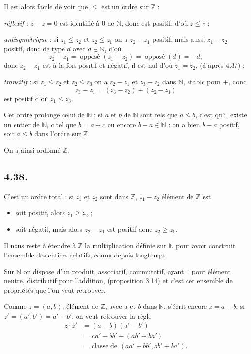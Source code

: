 Il est alors facile de voir que $\le$ est un ordre sur $\mathbb Z$ :

\emph{réflexif} : $z-z=0$ est identifié à $0$ de $\mathbb N$, donc est positif, d'où $z\le z$ ;

\emph{antisymétrique} : si $z_1\le z_2$ et $z_2\le z_1$ on a $z_2-z_1$ positif, mais aussi $z_1-z_2$ positif, donc de type $d$ avec $d\in\mathbb N$, d'où
\[
z_2-z_1=\operatorname{opposé}(z_1-z_2)=\operatorname{opposé}(d)=-d,
\]
donc $z_2-z_1$ est à la fois positif et négatif, il est nul d'où $z_1=z_2$, (d'après 4.37) ;

\emph{transitif} : si $z_1\le z_2$ et $z_2\le z_3$ on a $z_2-z_1$ et $z_3-z_2$ dans $\mathbb N$, stable pour $+$, donc
\[
z_3-z_1=(z_3-z_2)+(z_2-z_1)
\]
est positif d'où $z_1\le z_3$.

Cet ordre prolonge celui de $\mathbb N$ : si $a$ et $b$ de $\mathbb N$ sont tels que $a\le b$, c'est qu'il existe un entier de $\mathbb N$, $c$ tel que $b=a+c$ ou encore $b-a\in\mathbb N$ : on a bien $b-a$ positif, soit $a\le b$ dans l'ordre sur $\mathbb Z$.

On a ainsi ordonné $\mathbb Z$. \bookend

\subsection*{4.38.}
C'est un ordre total : si $z_1$ et $z_2$ sont dans $\mathbb Z$, $z_1-z_2$ élément de $\mathbb Z$ est
\begin{itemize}[leftmargin=2.2em]
\item soit positif, alors $z_1\ge z_2$ ;
\item soit négatif, mais alors $z_2-z_1$ est positif donc $z_2\ge z_1$.
\end{itemize}

Il nous reste à étendre à $\mathbb Z$ la multiplication définie sur $\mathbb N$ pour avoir construit l'ensemble des entiers relatifs, connu depuis longtemps.

Sur $\mathbb N$ on dispose d'un produit, associatif, commutatif, ayant $1$ pour élément neutre, distributif pour l'addition, (proposition 3.14) et c'est cet ensemble de propriétés que l'on veut retrouver.

Comme $z=\overline{(a,b)}$, élément de $\mathbb Z$, avec $a$ et $b$ dans $\mathbb N$, s'écrit encore $z=a-b$, si $z'=\overline{(a',b')}=a'-b'$, on veut retrouver la règle
\begin{align*}
z\cdot z'&=(a-b)(a'-b')\\
&=aa'+bb'-(ab'+ba')\\
&=\text{classe de }(aa'+bb',ab'+ba').
\end{align*}

